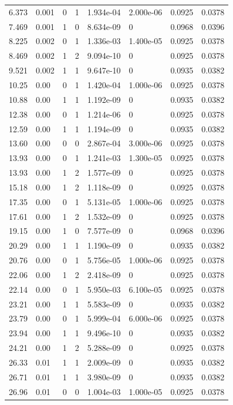 \documentclass[preview]{standalone}
\begin{document}
{{\begin{tabular}{L{1.2cm}C{1.2cm} C{0.3cm}C{0.5cm} C{1.4cm}C{1.4cm} C{1.4cm}C{1.4cm}}
  6.373  &  0.001  & 0     &  1 &  1.934e-04  & 2.000e-06  & 0.0925 &  0.0378   \\ 
  7.469  &  0.001  & 1     &  0 &  8.634e-09  & 0  & 0.0968 &  0.0396   \\ 
  8.225  &  0.002  & 0     &  1 &  1.336e-03  & 1.400e-05  & 0.0925 &  0.0378   \\ 
  8.469  &  0.002  & 1     &  2 &  9.094e-10  & 0  & 0.0925 &  0.0378   \\ 
  9.521  &  0.002  & 1     &  1 &  9.647e-10  & 0  & 0.0935 &  0.0382   \\ 
  10.25  &  0.00  & 0     &  1 &  1.420e-04  & 1.000e-06  & 0.0925 &  0.0378   \\ 
  10.88  &  0.00  & 1     &  1 &  1.192e-09  & 0  & 0.0935 &  0.0382   \\ 
  12.38  &  0.00  & 0     &  1 &  1.214e-06  & 0  & 0.0925 &  0.0378   \\ 
  12.59  &  0.00  & 1     &  1 &  1.194e-09  & 0  & 0.0935 &  0.0382   \\ 
  13.60  &  0.00  & 0     &  0 &  2.867e-04  & 3.000e-06  & 0.0925 &  0.0378   \\ 
  13.93  &  0.00  & 0     &  1 &  1.241e-03  & 1.300e-05  & 0.0925 &  0.0378   \\ 
  13.93  &  0.00  & 1     &  2 &  1.577e-09  & 0  & 0.0925 &  0.0378   \\ 
  15.18  &  0.00  & 1     &  2 &  1.118e-09  & 0  & 0.0925 &  0.0378   \\ 
  17.35  &  0.00  & 0     &  1 &  5.131e-05  & 1.000e-06  & 0.0925 &  0.0378   \\ 
  17.61  &  0.00  & 1     &  2 &  1.532e-09  & 0  & 0.0925 &  0.0378   \\ 
  19.15  &  0.00  & 1     &  0 &  7.577e-09  & 0  & 0.0968 &  0.0396   \\ 
  20.29  &  0.00  & 1     &  1 &  1.190e-09  & 0  & 0.0935 &  0.0382   \\ 
  20.76  &  0.00  & 0     &  1 &  5.756e-05  & 1.000e-06  & 0.0925 &  0.0378   \\ 
  22.06  &  0.00  & 1     &  2 &  2.418e-09  & 0  & 0.0925 &  0.0378   \\ 
  22.14  &  0.00  & 0     &  1 &  5.950e-03  & 6.100e-05  & 0.0925 &  0.0378   \\ 
  23.21  &  0.00  & 1     &  1 &  5.583e-09  & 0  & 0.0935 &  0.0382   \\ 
  23.79  &  0.00  & 0     &  1 &  5.999e-04  & 6.000e-06  & 0.0925 &  0.0378   \\ 
  23.94  &  0.00  & 1     &  1 &  9.496e-10  & 0  & 0.0935 &  0.0382   \\ 
  24.21  &  0.00  & 1     &  2 &  5.288e-09  & 0  & 0.0925 &  0.0378   \\ 
  26.33  &  0.01  & 1     &  1 &  2.009e-09  & 0  & 0.0935 &  0.0382   \\ 
  26.71  &  0.01  & 1     &  1 &  3.980e-09  & 0  & 0.0935 &  0.0382   \\ 
  26.96  &  0.01  & 0     &  0 &  1.004e-03  & 1.000e-05  & 0.0925 &  0.0378   \\ 
\hline 
\end{tabular} 

}}
\end{document}
